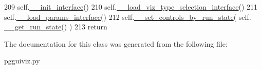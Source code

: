 \begin{DoxyCode}
209         self.\hyperlink{classnegui_1_1pgguiviz_1_1PGGuiViz_a59ea2bd8a30cf616d2f7e80d9f52f253}{\_\_init\_interface}()
210         self.\hyperlink{classnegui_1_1pgguiviz_1_1PGGuiViz_af2ff72c2f608dda04871de880e042fa0}{\_\_load\_viz\_type\_selection\_interface}()
211         self.\hyperlink{classnegui_1_1pgguiviz_1_1PGGuiViz_a40815d3de1c551c37167e071aed6396a}{\_\_load\_params\_interface}()
212         self.\hyperlink{classnegui_1_1pgguiviz_1_1PGGuiViz_a1b519576f5de6aa751a784156c92d1a9}{\_\_set\_controls\_by\_run\_state}( self.
      \hyperlink{classnegui_1_1pgguiviz_1_1PGGuiViz_a3aa0495588f28f15e3b9ab7a59dec9b8}{\_\_get\_run\_state}() )
213         \textcolor{keywordflow}{return}
\end{DoxyCode}


The documentation for this class was generated from the following file\+:\begin{DoxyCompactItemize}
\item 
pgguiviz.\+py\end{DoxyCompactItemize}
